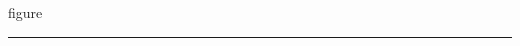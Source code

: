 \documentclass[draft]{pnuthesis2026}
\begin{document}
\begin{PNUObject}{figure}\rule{10mm}{1.1\textheight}\end{PNUObject}
\end{document}
